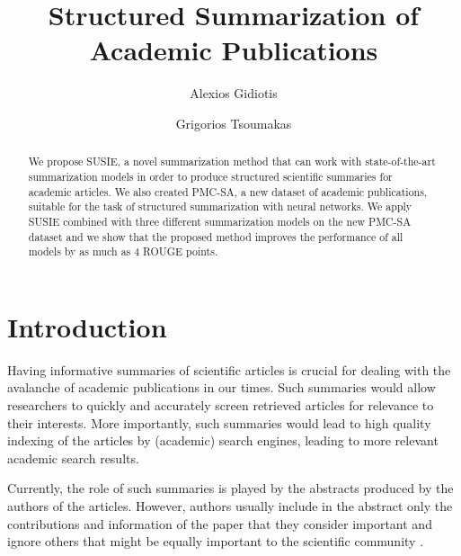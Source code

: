 \documentclass[runningheads]{llncs}
\begin{document}
%
\title{Structured Summarization of \\ Academic Publications}
%
%
\author{Alexios Gidiotis \and
Grigorios Tsoumakas}
%
%
%
\maketitle              %
%
\begin{abstract}
We propose SUSIE, a novel summarization method that can work with state-of-the-art summarization models in order to produce structured scientific summaries for academic articles. We also created PMC-SA, a new dataset of academic publications, suitable for the task of structured summarization with neural networks. We apply SUSIE combined with three different summarization models on the new PMC-SA dataset and we show that the proposed method improves the performance of all models by as much as 4 ROUGE points.
\end{abstract}
%
%
%
\section{Introduction}
Having informative summaries of scientific articles is crucial for dealing with the avalanche of academic publications in our times. Such summaries would allow researchers to quickly and accurately screen retrieved articles for relevance to their interests. More importantly, such summaries would lead to high quality indexing of the articles by (academic) search engines, leading to more relevant academic search results.     


Currently, the role of such summaries is played by the abstracts produced by the authors of the articles. However, authors usually include in the abstract only the contributions and information of the paper that they consider important and ignore others that might be equally important to the scientific community \cite{Elkiss2008BlindArticle}. 
\end{document}
